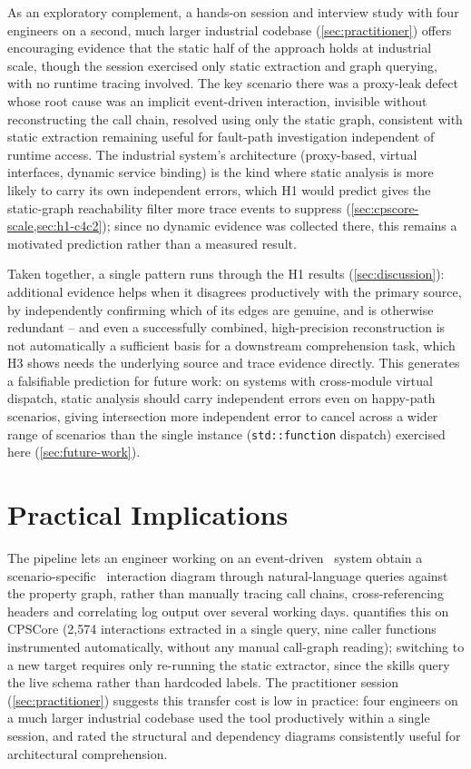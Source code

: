 As an exploratory complement, a hands-on session and interview study with
four engineers on a second, much larger industrial codebase
(\cref{sec:practitioner}) offers encouraging evidence that the static
half of the approach holds at industrial scale, though the session
exercised only static extraction and graph querying, with no runtime
tracing involved. The key scenario there was a proxy-leak defect whose
root cause was an implicit event-driven interaction, invisible without
reconstructing the call chain, resolved using only the static graph,
consistent with static extraction remaining useful for fault-path
investigation independent of runtime access. The industrial system's
architecture (proxy-based, virtual interfaces, dynamic service binding)
is the kind where static analysis is more likely to carry its own
independent errors, which H1 would predict gives the static-graph
reachability filter more trace events to suppress
(\cref{sec:cpscore-scale,sec:h1-c4c2}); since no dynamic
evidence was collected there, this remains a motivated prediction rather
than a measured result.

Taken together, a single pattern runs through the H1 results
(\cref{sec:discussion}): additional evidence helps when it disagrees
productively with the primary source, by independently confirming which
of its edges are genuine, and is otherwise redundant -- and even a
successfully combined, high-precision reconstruction is not automatically
a sufficient basis for a downstream comprehension task, which H3 shows
needs the underlying source and trace evidence directly. This generates a
falsifiable prediction for future work: on systems with cross-module
virtual dispatch, static analysis should carry independent errors even
on happy-path scenarios, giving intersection more independent error to
cancel across a wider range of scenarios than the single instance
(\texttt{std::function} dispatch) exercised here
(\cref{sec:future-work}).

\section{Practical Implications}

The pipeline lets an engineer working on an event-driven \Cpp\ system
obtain a scenario-specific \sysml\ interaction diagram through
natural-language queries against the property graph, rather than
manually tracing call chains, cross-referencing headers and correlating
log output over several working days.  quantifies this
on CPSCore (2,574 interactions extracted in a single query, nine caller
functions instrumented automatically, without any manual call-graph
reading); switching to a new target requires only re-running the static
extractor, since the skills query the live schema rather than hardcoded
labels. The practitioner session (\cref{sec:practitioner}) suggests this
transfer cost is low in practice: four engineers on a much larger
industrial codebase used the tool productively within a single session,
and rated the structural and dependency diagrams consistently useful for
architectural comprehension.

